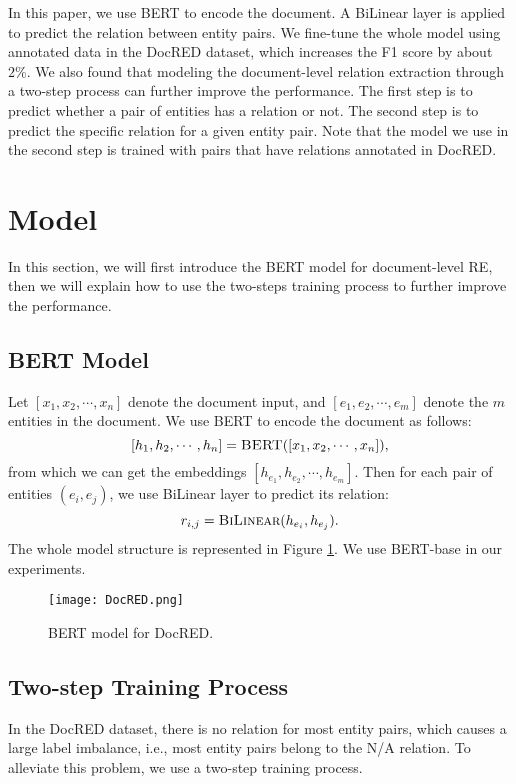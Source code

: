 \documentclass[11pt,a4paper]{article}
\begin{document}
In this paper, we use BERT to encode the document. A BiLinear layer is applied to predict the relation between entity pairs. We fine-tune the whole model using annotated data in the DocRED dataset, which increases the F1 score by about $2\%$. We also found that modeling the document-level relation extraction through a two-step process can further improve the performance. The first step is to predict whether a pair of entities has a relation or not. The second step is to predict the specific relation for a given entity pair. Note that the model we use in the second step is trained with pairs that have relations annotated in DocRED.

\section{Model}
In this section, we will first introduce the BERT model for document-level RE, then we will explain how to use the two-steps training process to further improve the performance.

\subsection{BERT Model}
Let $[x_1, x_2,\cdots, x_n]$ denote the document input, and $[e_1,e_2,\cdots,e_m]$ denote the $m$ entities in the document. We use BERT to encode the document as follows:
$$
    [h_1, h_2, \cdots, h_n] = \textsc{BERT}([x_1,x_2,\cdots,x_n]),
$$
from which we can get the embeddings $[h_{e_1}, h_{e_2},\cdots,h_{e_m}]$. Then for each pair of entities $(e_i, e_j)$, we use BiLinear layer to predict its relation:
$$
    r_{i,j} = \textsc{BiLinear}(h_{e_i}, h_{e_j}).
$$
The whole model structure is represented in Figure \ref{fig:model}. We use BERT-base in our experiments. 

\begin{figure}
    \centering
    \texttt{[image: DocRED.png]}
    \caption{BERT model for DocRED.}
    \label{fig:model}
\end{figure}

\subsection{Two-step Training Process}
In the DocRED dataset, there is no relation for most entity pairs, which causes a large label imbalance, i.e., most entity pairs belong to the N/A relation. To alleviate this problem, we use a two-step training process.
\end{document}
